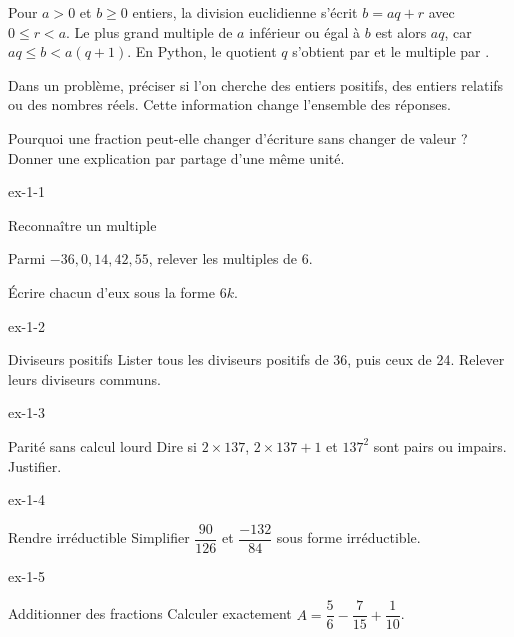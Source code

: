 \begin{propriete}Pour $a>0$ et $b\ge0$ entiers, la division euclidienne s’écrit $b=aq+r$ avec $0\le r<a$. Le plus grand multiple de $a$ inférieur ou égal à $b$ est alors $aq$, car $aq\le b<a(q+1)$. En Python, le quotient $q$ s’obtient par  et le multiple par .\end{propriete}
\begin{attention}Dans un problème, préciser si l'on cherche des entiers positifs, des entiers relatifs ou des nombres réels. Cette information change l'ensemble des réponses.\end{attention}
Pourquoi une fraction peut-elle changer d'écriture sans changer de valeur ? Donner une explication par partage d'une même unité.
\clearpage{}
\begin{blocLivre}{ex-1-1}
\begin{exercice}[1]{Reconnaître un multiple}
\begin{questions}
\item Parmi $-36,0,14,42,55$, relever les multiples de 6.
\item Écrire chacun d’eux sous la forme $6k$.
\end{questions}
\end{exercice}
\end{blocLivre}
\begin{blocLivre}{ex-1-2}
\begin{exercice}[1]{Diviseurs positifs}
Lister tous les diviseurs positifs de 36, puis ceux de 24. Relever leurs diviseurs communs.
\end{exercice}
\end{blocLivre}
\begin{blocLivre}{ex-1-3}
\begin{exercice}[1]{Parité sans calcul lourd}
Dire si $2\times137$, $2\times137+1$ et $137^2$ sont pairs ou impairs. Justifier.
\end{exercice}
\end{blocLivre}
\begin{blocLivre}{ex-1-4}
\begin{exercice}[1]{Rendre irréductible}
Simplifier $\dfrac{90}{126}$ et $\dfrac{-132}{84}$ sous forme irréductible.
\end{exercice}
\end{blocLivre}
\begin{blocLivre}{ex-1-5}
\begin{exercice}[1]{Additionner des fractions}
Calculer exactement $A=\dfrac56-\dfrac7{15}+\dfrac1{10}$.
\end{exercice}
\end{blocLivre}

